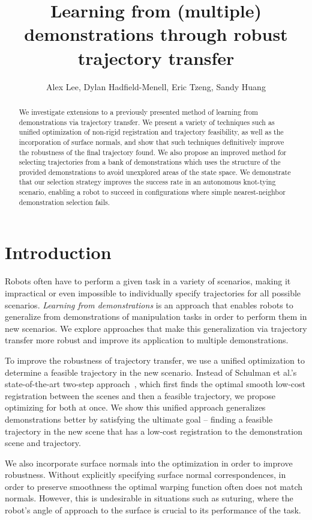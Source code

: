 \documentclass{article}
\title{Learning from (multiple) demonstrations through robust trajectory transfer}
\author{Alex Lee, Dylan Hadfield-Menell, Eric Tzeng, Sandy Huang}
\date{}
\begin{document}
\maketitle

\begin{abstract}
We investigate extensions to a previously presented method of learning from demonstrations via trajectory transfer. We present a variety of techniques such as unified optimization of non-rigid registration and trajectory feasibility, as well as the incorporation of surface normals, and show that such techniques definitively improve the robustness of the final trajectory found. We also propose an improved method for selecting trajectories from a bank of demonstrations which uses the structure of the provided demonstrations to avoid unexplored areas of the state space. We demonstrate that our selection strategy improves the success rate in an autonomous knot-tying scenario, enabling a robot to succeed in configurations where simple nearest-neighbor demonstration selection fails.
\end{abstract}

\section{Introduction}

Robots often have to perform a given task in a variety of scenarios, making it impractical or even impossible to individually specify trajectories for all possible scenarios. \emph{Learning from demonstrations} is an approach that enables robots to generalize from demonstrations of manipulation tasks in order to perform them in new scenarios. We explore approaches that make this generalization via trajectory transfer more robust and improve its application to multiple demonstrations.

To improve the robustness of trajectory transfer, we use a unified optimization to determine a feasible trajectory in the new scenario. Instead of Schulman et al.'s state-of-the-art two-step approach~\cite{Schulmanetal_ISRR2013}, which first finds the optimal smooth low-cost registration between the scenes and then a feasible trajectory, we propose optimizing for both at once. We show this unified approach generalizes demonstrations better by satisfying the ultimate goal -- finding a feasible trajectory in the new scene that has a low-cost registration to the demonstration scene and trajectory.

We also incorporate surface normals into the optimization in order to improve robustness. Without explicitly specifying surface normal correspondences, in order to preserve smoothness the optimal warping function often does not match normals. However, this is undesirable in situations such as suturing, where the robot's angle of approach to the surface is crucial to its performance of the task.
\end{document}
